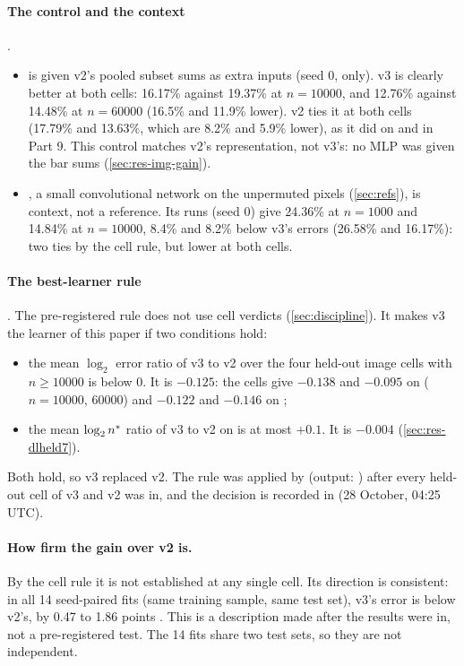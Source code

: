 \paragraph{The control and the context} .
\begin{itemize}
\item {} is  given v2's pooled subset sums as extra inputs (seed 0,  only). v3 is clearly better at both cells: 16.17\% against 19.37\% at $n=10000$, and 12.76\% against 14.48\% at $n=60000$ (16.5\% and 11.9\% lower). v2 ties it at both cells (17.79\% and 13.63\%, which are 8.2\% and 5.9\% lower), as it did on  and  in Part 9. This control matches v2's representation, not v3's: no MLP was given the bar sums (\cref{sec:res-img-gain}).
\item {}, a small convolutional network on the unpermuted pixels (\cref{sec:refs}), is context, not a reference. Its  runs (seed 0) give 24.36\% at $n=1000$ and 14.84\% at $n=10000$, 8.4\% and 8.2\% below v3's errors (26.58\% and 16.17\%): two ties by the cell rule, but lower at both cells.
\end{itemize}

\paragraph{The best-learner rule}\label{sec:res-img-rule} . The pre-registered rule does not use cell verdicts (\cref{sec:discipline}). It makes v3 the learner of this paper if two conditions hold:
\begin{itemize}
\item the mean $\log_2$ error ratio of v3 to v2 over the four held-out image cells with $n\ge10000$ is below 0. It is $-0.125$: the cells give $-0.138$ and $-0.095$ on  ($n=10000$, 60000) and $-0.122$ and $-0.146$ on ;
\item the mean $\log_2n^{*}$ ratio of v3 to v2 on  is at most $+0.1$. It is $-0.004$ (\cref{sec:res-dlheld7}).
\end{itemize}
Both hold, so v3 replaced v2. The rule was applied by  (output: ) after every held-out cell of v3 and v2 was in, and the decision is recorded in  (28 October, 04:25 UTC).

\paragraph{How firm the gain over v2 is.} By the cell rule it is not established at any single cell. Its direction is consistent: in all 14 seed-paired fits (same training sample, same test set), v3's error is below v2's, by 0.47 to 1.86 points . This is a description made after the results were in, not a pre-registered test. The 14 fits share two test sets, so they are not independent.

